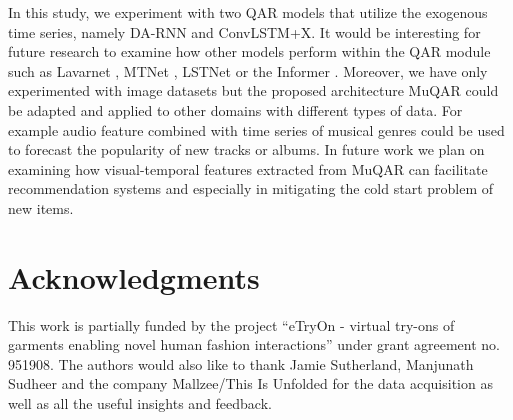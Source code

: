 \documentclass{article}
\begin{document}
In this study, we experiment with two QAR models that utilize the exogenous time series, namely DA-RNN and ConvLSTM+X. It would be interesting for future research to examine how other models perform within the QAR module such as Lavarnet \cite{koutlis2020lavarnet}, MTNet \cite{chang2018memory}, LSTNet \cite{lai2018modeling} or the Informer \cite{zhou2021informer}.
Moreover, we have only experimented with image datasets but the proposed architecture MuQAR could be adapted and applied to other domains with different types of data. For example audio feature combined with time series of musical genres could be used to forecast the popularity of new tracks or albums. 
In future work we plan on examining how visual-temporal features extracted from MuQAR can facilitate recommendation systems and especially in mitigating the cold start problem of new items.

\section{Acknowledgments}
This work is partially funded by the project ``eTryOn - virtual try-ons of garments enabling novel human fashion interactions'' under grant agreement no. 951908. The authors would also like to thank Jamie Sutherland, Manjunath Sudheer and the company Mallzee/This Is Unfolded for the data acquisition as well as all the useful insights and feedback.

  

\end{document}
